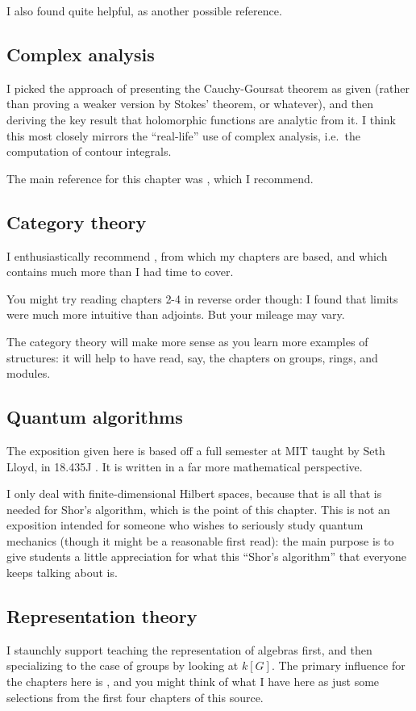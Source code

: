 I also found \cite{ref:lebesgue} quite helpful,
as another possible reference.

\subsection{Complex analysis}
I picked the approach of presenting the Cauchy-Goursat theorem as given
(rather than proving a weaker version by Stokes' theorem, or whatever),
and then deriving the key result that holomorphic functions are analytic
from it.
I think this most closely mirrors the ``real-life'' use of complex
analysis, i.e.\ the computation of contour integrals.

The main reference for this chapter was \cite{ref:dartmouth}, which I recommend.

\subsection{Category theory}
I enthusiastically recommend \cite{ref:msci},
from which my chapters are based,
and which contains much more than I had time to cover.

You might try reading chapters {2-4} in reverse order though:
I found that limits were much more intuitive than adjoints.
But your mileage may vary.

The category theory will make more sense as you learn
more examples of structures: it will help to have read,
say, the chapters on groups, rings, and modules.

\subsection{Quantum algorithms}
The exposition given here is based off a full semester
at MIT taught by Seth Lloyd, in 18.435J \cite{ref:18-435}.
It is written in a far more mathematical perspective.

I only deal with finite-dimensional Hilbert spaces,
because that is all that is needed for Shor's algorithm,
which is the point of this chapter.
This is not an exposition intended for someone who wishes to seriously
study quantum mechanics (though it might be a reasonable first read):
the main purpose is to give students a little appreciation for
what this ``Shor's algorithm'' that everyone keeps talking about is.

\subsection{Representation theory}
I staunchly support teaching the representation of algebras first,
and then specializing to the case of groups by looking at $k[G]$.
The primary influence for the chapters here is \cite{ref:etingof},
and you might think of what I have here as just some selections
from the first four chapters of this source.

